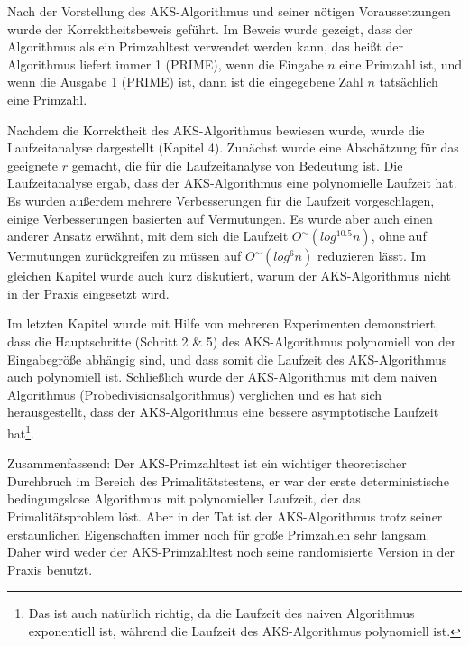 \documentclass[12pt,oneside]{article}
\theoremstyle{remark}
\theoremstyle{definition}
\begin{document}
Nach der Vorstellung des AKS-Algorithmus und seiner nötigen Voraussetzungen wurde der Korrektheitsbeweis geführt. Im Beweis wurde gezeigt, dass der Algorithmus als ein Primzahltest verwendet werden kann, das heißt der Algorithmus liefert immer 1 (PRIME), wenn die Eingabe $n$ eine Primzahl ist, und wenn die Ausgabe 1 (PRIME) ist, dann ist die eingegebene Zahl $n$ tatsächlich eine Primzahl.

Nachdem die Korrektheit des AKS-Algorithmus bewiesen wurde, wurde die Laufzeitanalyse dargestellt (Kapitel 4). Zunächst wurde eine Abschätzung für das geeignete $r$ gemacht, die für die Laufzeitanalyse von Bedeutung ist. Die Laufzeitanalyse ergab, dass der AKS-Algorithmus eine polynomielle Laufzeit hat. Es wurden außerdem mehrere Verbesserungen für die Laufzeit vorgeschlagen, einige Verbesserungen basierten auf Vermutungen. Es wurde aber auch einen anderer Ansatz erwähnt, mit dem sich die Laufzeit $O^{\sim}(log^{10.5}n)$, ohne auf Vermutungen zurückgreifen zu müssen auf $O^{\sim}(log^6n)$ reduzieren lässt. Im gleichen Kapitel wurde auch kurz diskutiert, warum der AKS-Algorithmus nicht in der Praxis eingesetzt wird.

Im letzten Kapitel wurde mit Hilfe von mehreren Experimenten demonstriert, dass die Hauptschritte (Schritt 2 \& 5) des AKS-Algorithmus polynomiell von der Eingabegröße abhängig sind, und dass somit die Laufzeit des AKS-Algorithmus auch polynomiell ist. Schließlich wurde der AKS-Algorithmus mit dem naiven Algorithmus (Probedivisionsalgorithmus) verglichen und es hat sich herausgestellt, dass der AKS-Algorithmus eine bessere asymptotische Laufzeit hat\footnote{Das ist auch natürlich richtig, da die Laufzeit des naiven Algorithmus exponentiell ist, während die Laufzeit des AKS-Algorithmus polynomiell ist.}.

Zusammenfassend: Der AKS-Primzahltest ist ein wichtiger theoretischer Durchbruch im Bereich des Primalitätstestens, er war der erste deterministische bedingungslose Algorithmus mit polynomieller Laufzeit, der das Primalitätsproblem löst. Aber in der Tat ist der AKS-Algorithmus trotz seiner erstaunlichen Eigenschaften immer noch für große Primzahlen sehr langsam. Daher wird weder der AKS-Primzahltest noch seine randomisierte Version in der Praxis benutzt.



 


\clearpage
\lhead{}
\printbibliography
{}
\end{document}
